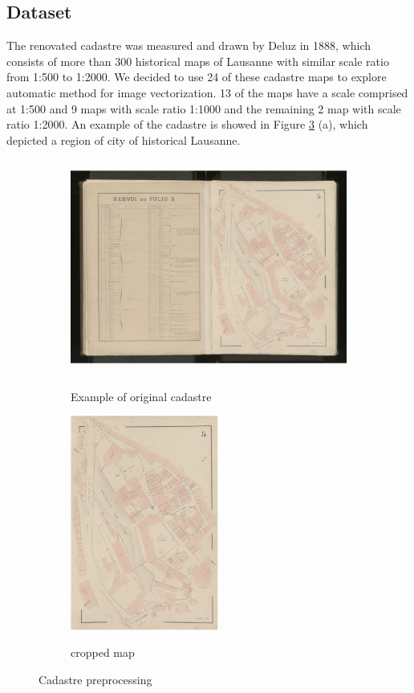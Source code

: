 \documentclass[12pt]{article}
\begin{document}
\subsection{Dataset}
The renovated cadastre was measured and drawn by Deluz in 1888, which consists of more than 300 historical maps of Lausanne with similar scale ratio from 1:500 to 1:2000. We decided to use 24 of these cadastre maps to explore automatic method for image vectorization. 13 of the maps have a scale comprised at 1:500 and 9 maps with scale ratio 1:1000 and the remaining 2 map with scale ratio 1:2000. An example of the cadastre is showed in Figure \ref{fig:cadaster-preprocessing} (a), which depicted a region of city of historical Lausanne.   
\begin{figure}[H]
	\begin{subfigure}[b]{.66\textwidth}
		\centering
		\includegraphics[height=200pt]{images/original.jpg}  
		\label{fig:original-images}
		\caption{Example of original cadastre}
	\end{subfigure}
	\begin{subfigure}[b]{.33\textwidth}
		\centering
		\includegraphics[height=200pt]{images/img1.png}  
		\label{fig:cropped-images}
		\caption{cropped map}
	\end{subfigure}
	
	\caption{Cadastre preprocessing}
	\label{fig:cadaster-preprocessing}
\end{figure}
\end{document}
